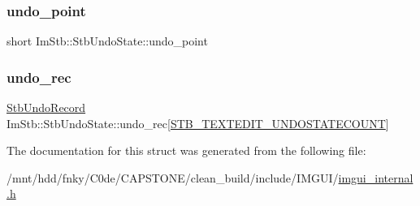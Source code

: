 \subsubsection{\texorpdfstring{undo\+\_\+point}{undo\_point}}
{\footnotesize\ttfamily short Im\+Stb\+::\+Stb\+Undo\+State\+::undo\+\_\+point}

\mbox{\label{structImStb_1_1StbUndoState_a0cac31054133ca474b349647e74b8edc}} 
\subsubsection{\texorpdfstring{undo\+\_\+rec}{undo\_rec}}
{\footnotesize\ttfamily \hyperlink{structImStb_1_1StbUndoRecord}{Stb\+Undo\+Record} Im\+Stb\+::\+Stb\+Undo\+State\+::undo\+\_\+rec\mbox{[}\hyperlink{imstb__textedit_8h_afa79483143df87a1497010712b3dfaf9}{S\+T\+B\+\_\+\+T\+E\+X\+T\+E\+D\+I\+T\+\_\+\+U\+N\+D\+O\+S\+T\+A\+T\+E\+C\+O\+U\+NT}\mbox{]}}



The documentation for this struct was generated from the following file\+:\begin{DoxyCompactItemize}
\item 
/mnt/hdd/fnky/\+C0de/\+C\+A\+P\+S\+T\+O\+N\+E/clean\+\_\+build/include/\+I\+M\+G\+U\+I/\hyperlink{imgui__internal_8h}{imgui\+\_\+internal.\+h}\end{DoxyCompactItemize}

